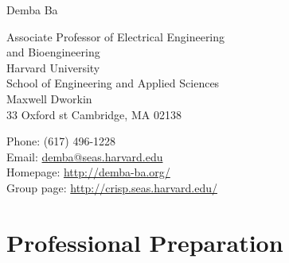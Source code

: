 \documentclass[12pt]{article}
\makeatletter
\let\saved@bibitem\@bibitem %
\def\HCode#1{}
\def\name{Demba Ba}
\renewenvironment{itemize}{
  \begin{list}{}{
    \setlength{\itemsep}{0.25em}
    \setlength{\parskip}{0pt}
    \setlength{\parsep}{0.25em}
  }
}{
  \end{list}
}
\makeatother
\begin{document}
\sloppy

\begingroup
\makeatletter
\let\@bibitem\saved@bibitem %
\endgroup

\HCode{<div class="fluid-container"}

\HCode{<div class="row">}
\HCode{<div class="col-md-12">}
\HCode{<h1>}
{\huge \name}
\HCode{</h1>}
\HCode{</div>} %
\HCode{</div>} %

\bigskip

\HCode{<div class="row">}
\HCode{<div class="col-md-4">}
\begin{minipage}[t]{0.5\textwidth}
  Associate Professor of Electrical Engineering \\
  and Bioengineering \\
  Harvard University \\
  School of Engineering and Applied Sciences \\
  Maxwell Dworkin \\
  33 Oxford st
  Cambridge, MA 02138 \\
\end{minipage}
\HCode{</div>} %
\HCode{<div class="col-md-8">}
\begin{minipage}[t]{0.5\textwidth}
  Phone: (617) 496-1228 \\
  Email: \href{mailto:demba@seas.harvard.edu}{demba@seas.harvard.edu} \\
  Homepage: \href{http://demba-ba.org/}{http://demba-ba.org/} \\
  Group page: \href{http://crisp.seas.harvard.edu}{http://crisp.seas.harvard.edu/}
\end{minipage}
\HCode{</div>} %
\HCode{</div>} %

\HCode{<div class="row">}
\HCode{<div class="col-md-12">}
\section*{Professional Preparation}

\end{document}
